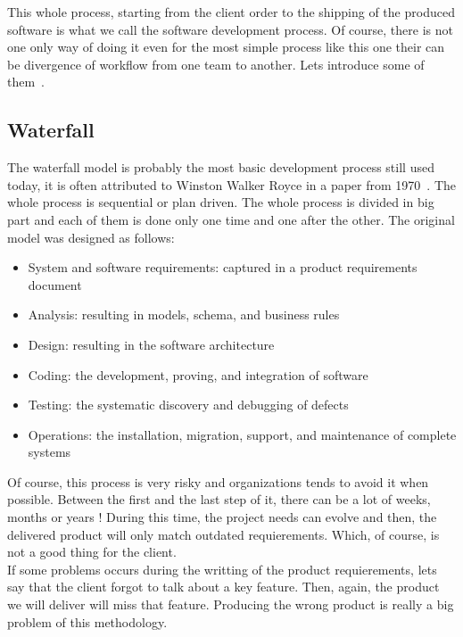 \documentclass[12pt]{article}
\begin{document}
This whole process, starting from the client order to the shipping of the produced software is what we call the software development process. Of course, there is not one only way of doing it even for the most simple process like this one their can be divergence of workflow from one team to another. Lets introduce some of them~\cite{IIS2:IIS202348}.

\subsection{Waterfall}

The waterfall model is probably the most basic development process still used today, it is often attributed to Winston Walker Royce in a paper from 1970~\cite{BARYWBoehm:1987}. The whole process is sequential or plan driven. The whole process is divided in big part and each of them is done only one time and one after the other. The original model was designed as follows:\\

\begin{itemize}

\item System and software requirements: captured in a product requirements document
\item Analysis: resulting in models, schema, and business rules
\item Design: resulting in the software architecture
\item Coding: the development, proving, and integration of software
\item Testing: the systematic discovery and debugging of defects
\item Operations: the installation, migration, support, and maintenance of complete systems

\end{itemize}

Of course, this process is very risky and organizations tends to avoid it when possible. Between the first and the last step of it, there can be a lot of weeks, months or years ! During this time, the project needs can evolve and then, the delivered product will only match outdated requierements. Which, of course, is not a good thing for the client.\\

If some problems occurs during the writting of the product requierements, lets say that the client forgot to talk about a key feature. Then, again, the product we will deliver will miss that feature. Producing the wrong product is really a big problem of this methodology.\\
\end{document}
